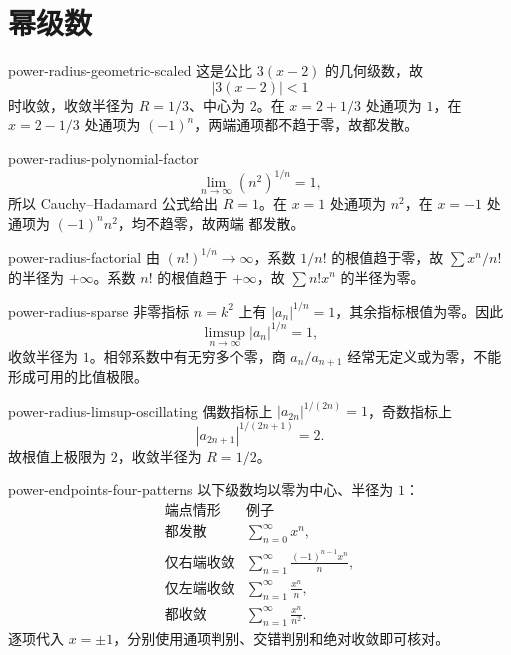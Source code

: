 \chapter{幂级数}
\label{chap:power-series-solutions}

\begin{solution}{power-radius-geometric-scaled}
这是公比 \(3(x-2)\) 的几何级数，故
\[
 |3(x-2)|<1
\]
时收敛，收敛半径为 \(R=1/3\)、中心为 \(2\)。在
\(x=2+1/3\) 处通项为 \(1\)，在 \(x=2-1/3\) 处通项为
\((-1)^n\)，两端通项都不趋于零，故都发散。
\end{solution}

\begin{solution}{power-radius-polynomial-factor}
\[
 \lim_{n\to\infty}(n^2)^{1/n}=1,
\]
所以 Cauchy--Hadamard 公式给出 \(R=1\)。在 \(x=1\) 处通项为
\(n^2\)，在 \(x=-1\) 处通项为 \((-1)^nn^2\)，均不趋零，故两端
都发散。
\end{solution}

\begin{solution}{power-radius-factorial}
由 \((n!)^{1/n}\to\infty\)，系数 \(1/n!\) 的根值趋于零，故
\(\sum x^n/n!\) 的半径为 \(+\infty\)。系数 \(n!\) 的根值趋于
\(+\infty\)，故 \(\sum n!x^n\) 的半径为零。
\end{solution}

\begin{solution}{power-radius-sparse}
非零指标 \(n=k^2\) 上有 \(|a_n|^{1/n}=1\)，其余指标根值为零。因此
\[
 \limsup_{n\to\infty}|a_n|^{1/n}=1,
\]
收敛半径为 \(1\)。相邻系数中有无穷多个零，商
\(a_n/a_{n+1}\) 经常无定义或为零，不能形成可用的比值极限。
\end{solution}

\begin{solution}{power-radius-limsup-oscillating}
偶数指标上 \(|a_{2n}|^{1/(2n)}=1\)，奇数指标上
\[
 |a_{2n+1}|^{1/(2n+1)}=2.
\]
故根值上极限为 \(2\)，收敛半径为 \(R=1/2\)。
\end{solution}

\begin{solution}{power-endpoints-four-patterns}
以下级数均以零为中心、半径为 \(1\)：
\[
\begin{array}{c|c}
\text{端点情形}&\text{例子}\\ \hline
\text{都发散}&\displaystyle\sum_{n=0}^\infty x^n,\\[0.4em]
\text{仅右端收敛}&\displaystyle\sum_{n=1}^\infty
 \frac{(-1)^{n-1}x^n}{n},\\[0.7em]
\text{仅左端收敛}&\displaystyle\sum_{n=1}^\infty\frac{x^n}{n},\\[0.7em]
\text{都收敛}&\displaystyle\sum_{n=1}^\infty\frac{x^n}{n^2}.
\end{array}
\]
逐项代入 \(x=\pm1\)，分别使用通项判别、交错判别和绝对收敛即可核对。
\end{solution}

